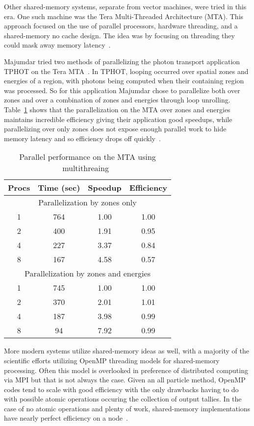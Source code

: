 %
Other shared-memory systems, separate from vector machines, were tried in this era.
%
One such machine was the Tera Multi-Threaded Architecture (MTA).
%
This approach focused on the use of parallel processors, hardware threading, and a shared-memory no cache design.
%
The idea was by focusing on threading they could mask away memory latency~\cite{majumdar2000parallel, snavely1998multi}.
%

%
Majumdar tried two methods of parallelizing the photon transport application TPHOT on the Tera MTA~\cite{majumdar2000parallel}. 
%
In TPHOT, looping occurred over spatial zones and energies of a region, with photons being computed when their containing region was processed. 
%
So for this application Majumdar chose to parallelize both over zones and over a combination of zones and energies through loop unrolling.
%
Table~\ref{tab:MTAPerf} shows that the parallelization on the MTA over zones and energies maintains incredible efficiency giving their application good speedups, while parallelizing over only zones does not expose enough parallel work to hide memory latency and so efficiency drops off quickly~\cite{majumdar2000parallel}.
%
\begin{table}
\caption {Parallel performance on the MTA using multithreaing~\cite{majumdar2000parallel}} \label{tab:MTAPerf} 
\begin{center}
\begin{tabular}{|c|c|c|c|}
\hline
Procs & Time (sec) & Speedup & Efficiency \\
\hline
\multicolumn{4}{|c|}{Parallelization by zones only} \\
\hline
1 & 764 & 1.00 & 1.00 \\
\hline
2 & 400 & 1.91 & 0.95 \\
\hline
4 & 227 & 3.37 & 0.84 \\
\hline
8 & 167 & 4.58 & 0.57 \\
\hline
\multicolumn{4}{|c|}{Parallelization by zones and energies} \\
\hline
1 & 745 & 1.00 & 1.00 \\
\hline
2 & 370 & 2.01 & 1.01 \\
\hline
4 & 187 & 3.98 & 0.99 \\
\hline
8 & 94 & 7.92 & 0.99 \\
\hline
\end{tabular}
\end{center}
\end{table}

More modern systems utilize shared-memory ideas as well, with a majority of the scientific efforts utilizing OpenMP threading models for shared-memory processing.
%
Often this model is overlooked in preference of distributed computing via MPI but that is not always the case.
%
Given an all particle method, OpenMP codes tend to scale with good efficiency with the only drawbacks having to do with possible atomic operations occuring the collection of output tallies.
%
In the case of no atomic operations and plenty of work, shared-memory implementations have nearly perfect efficiency on a node~\cite{siegel2014multi}.

